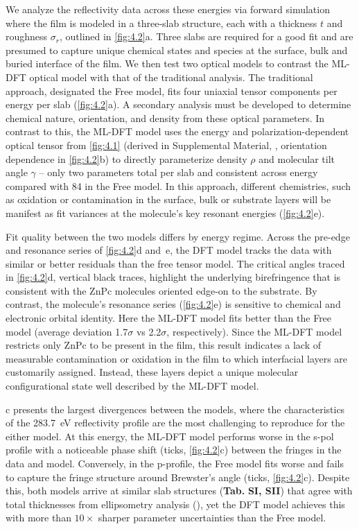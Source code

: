 We analyze the reflectivity data across these energies via forward simulation where the film is modeled in a three-slab structure, each with a thickness \(t\) and roughness \(\sigma_{r}\), outlined in \cref{fig:4.2}a. Three slabs are required for a good fit and are presumed to capture unique chemical states and species at the surface, bulk and buried interface of the film. We then test two optical models to contrast the ML-DFT optical model with that of the traditional analysis. The traditional approach, designated the Free model, fits four uniaxial tensor components per energy per slab (\cref{fig:4.2}a). A secondary analysis must be developed to determine chemical nature, orientation, and density from these optical parameters. In contrast to this, the ML-DFT model uses the energy and polarization-dependent optical tensor from \cref{fig:4.1} (derived in Supplemental Material, , orientation dependence in \cref{fig:4.2}b) to directly parameterize density \(\rho\) and molecular tilt angle \(\gamma\) -- only two parameters total per slab and consistent across energy compared with 84 in the Free model. In this approach, different chemistries, such as oxidation or contamination in the surface, bulk or substrate layers will be manifest as fit variances at the molecule's key resonant energies (\cref{fig:4.2}e).

Fit quality between the two models differs by energy regime. Across the pre-edge and resonance series of \cref{fig:4.2}d and~e, the DFT model tracks the data with similar or better residuals than the free tensor model. The critical angles traced in \cref{fig:4.2}d, vertical black traces, highlight the underlying birefringence that is consistent with the ZnPc molecules oriented edge-on to the substrate. By contrast, the molecule's resonance series (\cref{fig:4.2}e) is sensitive to chemical and electronic orbital identity. Here the ML-DFT model fits better than the Free model (average deviation 1.7\(\sigma\) vs 2.2\(\sigma\), respectively). Since the ML-DFT model restricts only ZnPc to be present in the film, this result indicates a lack of measurable contamination or oxidation in the film to which interfacial layers are customarily assigned.\autocite{ferronCharacterizationInterfacialOrientation2022,mezgerMolecularOrientationSoft2011,ferronCompositionDictatesMolecular2023,pasqualiStructuralElectronicProperties2014a} Instead, these layers depict a unique molecular configurational state well described by the ML-DFT model.

c presents the largest divergences between the models, where the characteristics of the \qty{283.7}{eV} reflectivity profile are the most challenging to reproduce for the either model. At this energy, the ML-DFT model performs worse in the s-pol profile with a noticeable phase shift (ticks, \cref{fig:4.2}c) between the fringes in the data and model. Conversely, in the p-profile, the Free model fits worse and fails to capture the fringe structure around Brewster's angle (ticks, \cref{fig:4.2}c). Despite this, both models arrive at similar slab structures (\textbf{Tab.} \textbf{SI, SII}) that agree with total thicknesses from ellipsometry analysis (), yet the DFT model achieves this with more than \(10\times\) sharper parameter uncertainties than the Free model.

